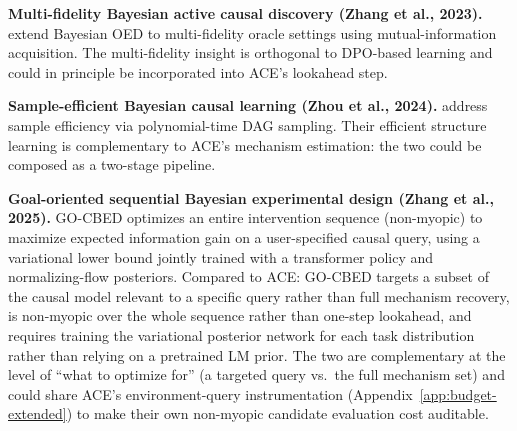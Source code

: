 \documentclass[twoside]{article}
\theoremstyle{plain}
\theoremstyle{definition}
\theoremstyle{remark}
\begin{document}
\textbf{Multi-fidelity Bayesian active causal discovery (Zhang et al., 2023).} \citet{zhang2023bayesian} extend Bayesian OED to multi-fidelity oracle settings using mutual-information acquisition. The multi-fidelity insight is orthogonal to DPO-based learning and could in principle be incorporated into ACE's lookahead step.

\textbf{Sample-efficient Bayesian causal learning (Zhou et al., 2024).} \citet{zhou2024sample} address sample efficiency via polynomial-time DAG sampling. Their efficient structure learning is complementary to ACE's mechanism estimation: the two could be composed as a two-stage pipeline.

\textbf{Goal-oriented sequential Bayesian experimental design (Zhang et al., 2025).} GO-CBED \citep{zhang2025gocbed} optimizes an entire intervention sequence (non-myopic) to maximize expected information gain on a user-specified causal query, using a variational lower bound jointly trained with a transformer policy and normalizing-flow posteriors. Compared to ACE: GO-CBED targets a subset of the causal model relevant to a specific query rather than full mechanism recovery, is non-myopic over the whole sequence rather than one-step lookahead, and requires training the variational posterior network for each task distribution rather than relying on a pretrained LM prior. The two are complementary at the level of ``what to optimize for'' (a targeted query vs.\ the full mechanism set) and could share ACE's environment-query instrumentation (Appendix~\ref{app:budget-extended}) to make their own non-myopic candidate evaluation cost auditable.
\end{document}
